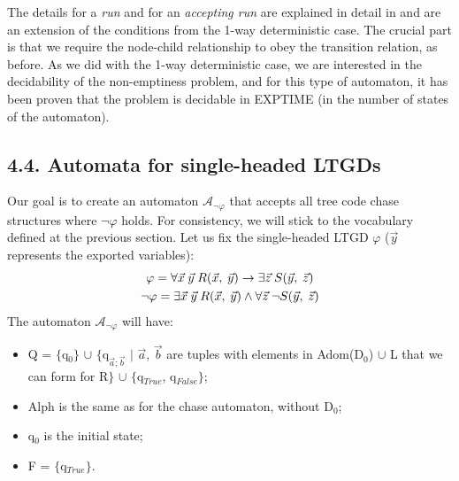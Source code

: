 \documentclass[11pt, a4paper, dvipsnames]{article}
\begin{document}
The details for a \textit{run} and for an \textit{accepting run} are explained in detail in \cite{decidable} and are an extension of the conditions from the 1-way deterministic case. The crucial part is that we require the node-child relationship to obey the transition relation, as before. As we did with the 1-way deterministic case, we are interested in the decidability of the non-emptiness problem, and for this type of automaton, it has been proven that the problem is decidable in EXPTIME (in the number of states of the automaton).

\subsection{4.4. Automata for single-headed LTGDs}
Our goal is to create an automaton $\mathcal{A}_{\neg \varphi}$ that accepts all tree code chase structures where $\neg \varphi$ holds. For consistency, we will stick to the vocabulary defined at the previous section. \newline
Let us fix the single-headed LTGD $\varphi$ ($\vec{y}$ represents the exported variables):
\begin{gather*}
\varphi = \forall \vec{x} \hspace{0.25em}\vec{y} \hspace{0.25em}R(\vec{x}, \hspace{0.25em} \vec{y}) \rightarrow \exists \vec{z} \hspace{0.25em}S(\vec{y}, \hspace{0.25em}\vec{z})\\
\neg \varphi = \exists \vec{x} \hspace{0.25em} \vec{y} \hspace{0.25em} R(\vec{x}, \hspace{0.25em} \vec{y}) \wedge \forall \vec{z} \hspace{0.25em} \neg S(\vec{y}, \hspace{0.25em}\vec{z})
\end{gather*}
The automaton $\mathcal{A}_{\neg \varphi}$ will have:
\begin{itemize}
	\item Q = $\{$q$_{0}\}$ $\cup$ $\{$q$_{\vec{a};\vec{b}}$ $|$ $\vec{a}$, $\vec{b}$ are tuples with elements in Adom(D$_{0}$) $\cup$ L that we can form for R$\}$ $\cup$ $\{$q$_{True}$, q$_{False}\}$;
	\item Alph is the same as for the chase automaton, without D$_{0}$;
	\item q$_{0}$ is the initial state;
	\item F = $\{$q$_{True}\}$.
\end{itemize}
\end{document}
